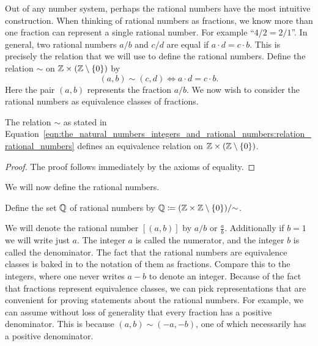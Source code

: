\documentclass[../main.tex]{subfiles}
\begin{document}
Out of any number system, perhaps the rational numbers have the most intuitive construction. When thinking of rational numbers as fractions, we know more than one fraction can represent a single rational number. For example ``$4/2=2/1$''. In general, two rational numbers $a/b$ and $c/d$ are equal if $a\cdot d=c\cdot b$. This is precisely the relation that we will use to define the rational numbers. Define the relation $\sim$ on $\mathbb{Z}\times(\mathbb{Z}\setminus\{0\})$ by
\begin{equation}\label{eqn:the_natural_numbers_integers_and_rational_numbers:relation_rational_numbers}
    (a,b)\sim(c,d)\iff a\cdot d=c\cdot b.
\end{equation}
Here the pair $(a,b)$ represents the fraction $a/b$. We now wish to consider the rational numbers as equivalence classes of fractions.
\begin{lemma}
    The relation $\sim$ as stated in Equation~\eqref{eqn:the_natural_numbers_integers_and_rational_numbers:relation_rational_numbers} defines an equivalence relation on $\mathbb{Z}\times(\mathbb{Z}\setminus\{0\})$.
\end{lemma}
\begin{proof}
    The proof follows immediately by the axioms of equality.
\end{proof}
We will now define the rational numbers.
\begin{definition}
    Define the set $\mathbb{Q}$ of rational numbers by $\mathbb{Q}\coloneq(\mathbb{Z}\times\mathbb{Z}\setminus\{0\})/{\sim}$.
\end{definition}
We will denote the rational number $[(a,b)]$ by $a/b$ or $\frac{a}{b}$. Additionally if $b=1$ we will write just $a$. The integer $a$ is called the numerator, and the integer $b$ is called the denominator. The fact that the rational numbers are equivalence classes is baked in to the notation of them as fractions. Compare this to the integers, where one never writes $a-b$ to denote an integer. Because of the fact that fractions represent equivalence classes, we can pick representations that are convenient for proving statements about the rational numbers. For example, we can assume without loss of generality that every fraction has a positive denominator. This is because $(a,b)\sim(-a,-b)$, one of which necessarily has a positive denominator.
\end{document}
